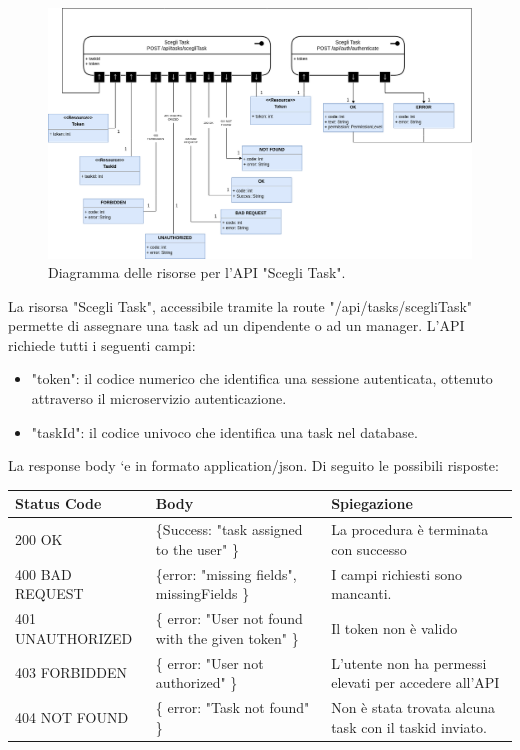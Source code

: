 \documentclass{report}
\begin{document}
\begin{figure}[H]
	\centering\includegraphics[width=1\textwidth]{images/scegli_task_model.png}
	Diagramma delle risorse per l'API "Scegli Task".
\end{figure}

La risorsa "Scegli Task", accessibile tramite la route "/api/tasks/scegliTask" permette di assegnare una task ad un dipendente o ad un manager. L'API richiede tutti i seguenti campi:

\begin{itemize}
	\item "token": il codice numerico che identifica una sessione autenticata, ottenuto attraverso il microservizio autenticazione.
	\item "taskId": il codice univoco che identifica una task nel database.
\end{itemize}

La response body `e in formato application/json. Di seguito le possibili risposte:

\begin{center} %
	\centering
	\begin{tabular}{ |p{4cm}|p{4cm}|p{4cm}| }
		\hline
		\centering Status Code & \qquad\qquad\quad Body & \qquad\quad Spiegazione\\ %
		\hline
		200 OK & \{Success: "task assigned to the user" \}  & La procedura è terminata con successo	\\ 
		\hline
		400 BAD REQUEST & \{error: "missing fields", missingFields \} & I campi richiesti sono mancanti. \\
		\hline
		401 UNAUTHORIZED & \{ error: "User not found with the given token" \} & Il token non è valido \\
		\hline
		403 FORBIDDEN & \{ error: "User not authorized" \} &  L'utente non ha permessi elevati per accedere all'API \\
		\hline
		404 NOT FOUND & \{ error: "Task not found" \} & Non è stata trovata alcuna task con il taskid inviato. \\
		\hline
	\end{tabular}
\end{center}
\end{document}
